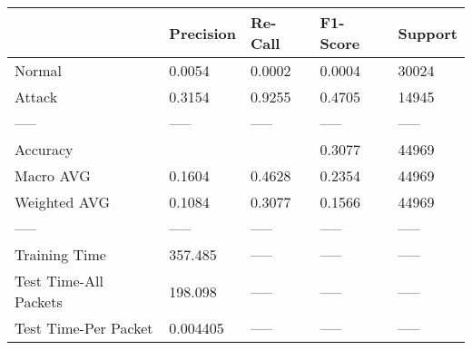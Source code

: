 \begin{tabular}{lllll}
\toprule
{} & Precision & Re-Call & F1-Score & Support \\
\midrule
Normal                &    0.0054 &  0.0002 &   0.0004 &   30024 \\
Attack                &    0.3154 &  0.9255 &   0.4705 &   14945 \\
-----                 &     ----- &   ----- &    ----- &   ----- \\
Accuracy              &           &         &   0.3077 &   44969 \\
Macro AVG             &    0.1604 &  0.4628 &   0.2354 &   44969 \\
Weighted AVG          &    0.1084 &  0.3077 &   0.1566 &   44969 \\
-----                 &     ----- &   ----- &    ----- &   ----- \\
Training Time         &   357.485 &   ----- &    ----- &   ----- \\
Test Time-All Packets &   198.098 &   ----- &    ----- &   ----- \\
Test Time-Per Packet  &  0.004405 &   ----- &    ----- &   ----- \\
\bottomrule
\end{tabular}
